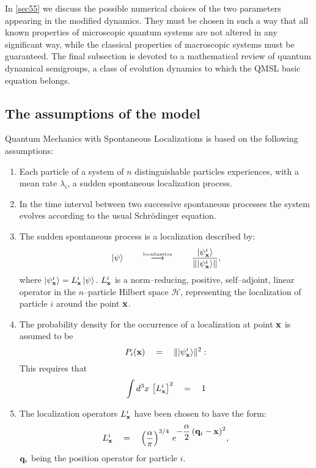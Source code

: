 \documentclass[10pt,a4paper]{article}
\begin{document}
In \ref{sec55} we discuss the possible numerical choices of the
two parameters appearing in the modified dynamics. They must be
chosen in such a way that all known properties of microscopic
quantum systems are not altered in any significant way, while the
classical properties of macroscopic systems must be guaranteed.
The final subsection is devoted to a mathematical review of
quantum dynamical semigroups, a class of evolution dynamics to
which the QMSL basic equation belongs.


\subsection{The assumptions of the model} \label{sec51}

Quantum Mechanics with Spontaneous Localizations \cite{heid,grw} is
based on the following assumptions:
\begin{enumerate}
\item Each particle of a system of $n$ distinguishable
particles experiences, with a mean rate $\lambda_{i}$, a sudden
spontaneous localization process.
\item In the time interval between two successive spontaneous
processes the system evolves according to the usual Schr\"odinger
equation.
\item The sudden spontaneous process is a localization described by:
\begin{equation} \label{rc}
|\psi\rangle \qquad \stackrel{\makebox{\tiny
localization}}{\longrightarrow} \qquad \frac{|\psi^{i}_{\bf
x}\rangle}{\| |\psi^{i}_{\bf x}\rangle\|},
\end{equation}
where $|\psi^{i}_{\bf x}\rangle = L^{i}_{\bf x}\, |\psi\rangle$.
$L^{i}_{\bf x}$ is a norm--reducing, positive, self--adjoint,
linear operator in the $n$--particle Hilbert space ${\mathcal H}$,
representing the localization of particle $i$ around the point
${\bf x}$.
\item The probability density for the occurrence of a localization
at point ${\bf x}$ is assumed to be
\begin{equation} \label{pd}
P_{i}({\bf x}) \quad = \quad \| |\psi^{i}_{\bf x}\rangle\|^{2}:
\end{equation}
This requires that
\begin{equation}
\int d^{3}x\, \left[ L^{i}_{\bf x}\right]^{2} \quad = \quad 1
\end{equation}
\item The localization operators $L^{i}_{\bf x}$ have been chosen
to have the form:
\begin{equation}
L^{i}_{\bf x} \quad = \quad\left(\frac{\alpha}{\pi}\right)^{3/4}\,
e^{\displaystyle -\frac{\alpha}{2}\, ({\bf q}_{i} - {\bf x})^{2}},
\end{equation}
${\bf q}_{i}$ being the position operator for particle $i$.
\end{enumerate}
\end{document}
